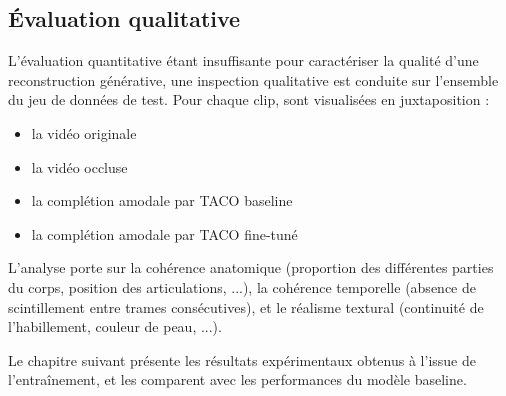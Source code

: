 \subsection{Évaluation qualitative}

L'évaluation quantitative étant insuffisante pour caractériser la qualité d'une reconstruction générative, une inspection qualitative est conduite sur l'ensemble du jeu de données de test. Pour chaque clip, sont visualisées en juxtaposition :

\begin{itemize}
  \item la vidéo originale
  \item la vidéo occluse
  \item la complétion amodale par TACO baseline
  \item la complétion amodale par TACO fine-tuné
\end{itemize}

L'analyse porte sur la cohérence anatomique (proportion des différentes parties du corps, position des articulations, ...), la cohérence temporelle (absence de scintillement entre trames consécutives), et le réalisme textural (continuité de l'habillement, couleur de peau, ...).


\medskip
Le chapitre suivant présente les résultats expérimentaux obtenus à l'issue de l'entraînement, et les comparent avec les performances du modèle baseline.